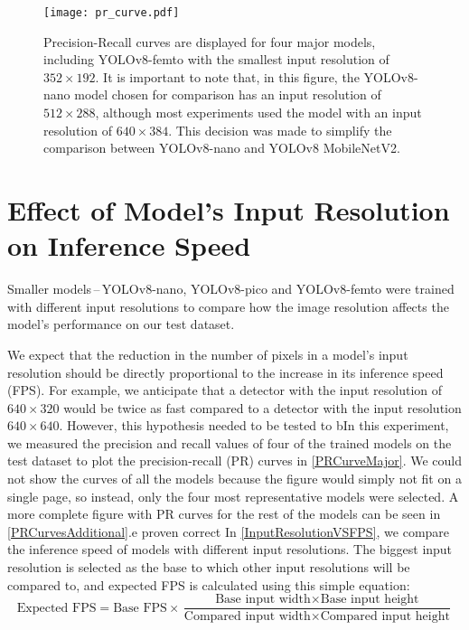 \begin{figure}[H]
    \begin{framed}
        \centering
        \texttt{[image: pr\_curve.pdf]}
        \caption{Precision-Recall curves are displayed for four major models,
        including YOLOv8-femto with the smallest input resolution of $352 \times 192$. It
        is important to note that, in this figure, the YOLOv8-nano model chosen for
        comparison has an input resolution of $512 \times 288$, although most experiments
        used the model with an input resolution of $640 \times 384$. This decision was
        made to simplify the comparison between YOLOv8-nano and YOLOv8 MobileNetV2.}
        \label{PRCurveMajor}
    \end{framed}
\end{figure}






\section{Effect of Model's Input Resolution on Inference Speed}
\label{InputResolutionVSFPSExperiment}

Smaller models\,--\,YOLOv8-nano, YOLOv8-pico and YOLOv8-femto were trained with
different input resolutions to compare how the image resolution affects
the model's performance on our test dataset.

We expect that the reduction in the number of pixels in a model's input resolution
should be directly proportional to the increase in its inference speed (FPS).
For example, we anticipate that a detector with the input resolution of $640 \times
320$ would be twice as fast compared to a detector with the input resolution $640
\times 640$. However, this hypothesis needed to be tested to bIn this experiment, we measured the precision and recall values of four of the
trained models on the test dataset to plot the precision-recall (PR) curves in
\autoref{PRCurveMajor}. We could not show the curves of all the models because
the figure would simply not fit on a single page, so instead, only the four most
representative models were selected. A more complete figure with PR curves for
the rest of the models can be seen in \autoref{PRCurvesAdditional}.e proven correct
In \autoref{InputResolutionVSFPS}, we compare the inference speed of models with
different input resolutions. The biggest input resolution is selected as the base to which
other input resolutions will be compared to, and expected FPS is calculated using
this simple equation:
\begin{equation}
    \text{Expected FPS} = \text{Base FPS} \times \frac{\text{Base input width} \times \text{Base input height}}{\text{Compared input width} \times \text{Compared input height}}
\end{equation}

